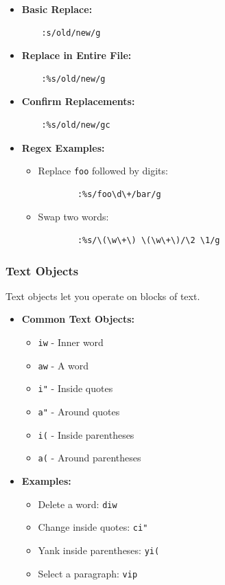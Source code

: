 \documentclass{article}
\begin{document}
\begin{itemize}
    \item \textbf{Basic Replace:}
    \begin{verbatim}
    :s/old/new/g
    \end{verbatim}

    \item \textbf{Replace in Entire File:}
    \begin{verbatim}
    :%s/old/new/g
    \end{verbatim}

    \item \textbf{Confirm Replacements:}
    \begin{verbatim}
    :%s/old/new/gc
    \end{verbatim}

    \item \textbf{Regex Examples:}
    \begin{itemize}
        \item Replace \texttt{foo} followed by digits:
        \begin{verbatim}
        :%s/foo\d\+/bar/g
        \end{verbatim}

        \item Swap two words:
        \begin{verbatim}
        :%s/\(\w\+\) \(\w\+\)/\2 \1/g
        \end{verbatim}
    \end{itemize}
\end{itemize}

\subsubsection{Text Objects}
Text objects let you operate on blocks of text.

\begin{itemize}
    \item \textbf{Common Text Objects:}
    \begin{itemize}
        \item \texttt{iw} - Inner word
        \item \texttt{aw} - A word
        \item \texttt{i"} - Inside quotes
        \item \texttt{a"} - Around quotes
        \item \texttt{i(} - Inside parentheses
        \item \texttt{a(} - Around parentheses
    \end{itemize}

    \item \textbf{Examples:}
    \begin{itemize}
        \item Delete a word: \texttt{diw}
        \item Change inside quotes: \texttt{ci"}
        \item Yank inside parentheses: \texttt{yi(}
        \item Select a paragraph: \texttt{vip}
    \end{itemize}
\end{itemize}
\end{document}
